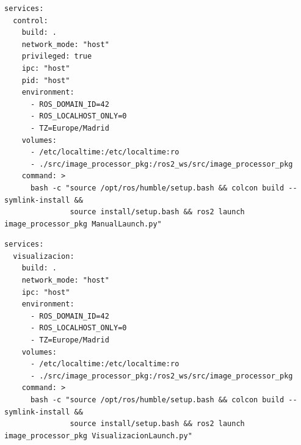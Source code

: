 \begin{lstlisting}[style=codigo, language=yamlsimple, caption={[Fichero de Docker Compose para levantar el controlador en modo manual]Fichero de Docker Compose para levantar el controlador en modo manual (\texttt{docker-compose-manual.yml})}, label={lst:compose-manual}]
services:
  control:
    build: .
    network_mode: "host"
    privileged: true
    ipc: "host"
    pid: "host"
    environment:
      - ROS_DOMAIN_ID=42
      - ROS_LOCALHOST_ONLY=0
      - TZ=Europe/Madrid
    volumes:
      - /etc/localtime:/etc/localtime:ro
      - ./src/image_processor_pkg:/ros2_ws/src/image_processor_pkg
    command: >
      bash -c "source /opt/ros/humble/setup.bash && colcon build --symlink-install &&
               source install/setup.bash && ros2 launch image_processor_pkg ManualLaunch.py"
\end{lstlisting}

\begin{lstlisting}[style=codigo, language=yamlsimple, caption={[Fichero de Docker Compose para levantar el panel en directo]Fichero de Docker Compose para levantar el panel en directo (\texttt{docker-compose-visualizacion.yml})}, label={lst:compose-visu}]
services:
  visualizacion:
    build: .
    network_mode: "host"
    ipc: "host"
    environment:
      - ROS_DOMAIN_ID=42
      - ROS_LOCALHOST_ONLY=0
      - TZ=Europe/Madrid
    volumes:
      - /etc/localtime:/etc/localtime:ro
      - ./src/image_processor_pkg:/ros2_ws/src/image_processor_pkg
    command: >
      bash -c "source /opt/ros/humble/setup.bash && colcon build --symlink-install &&
               source install/setup.bash && ros2 launch image_processor_pkg VisualizacionLaunch.py"
\end{lstlisting}
